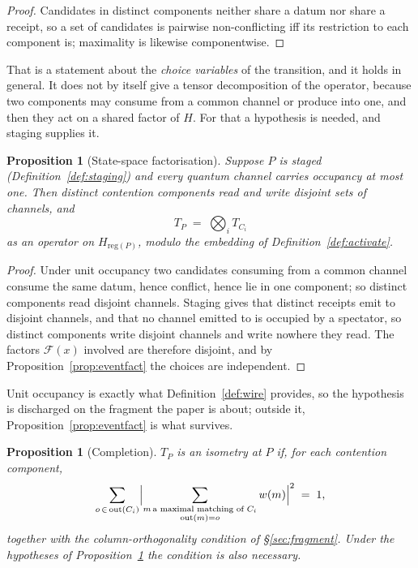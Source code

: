 \documentclass[11pt,a4paper]{article}
\theoremstyle{plain}
\newtheorem{proposition}[theorem]{Proposition}
\theoremstyle{definition}
\theoremstyle{remark}
\newcommand{\Out}{\mathrm{out}}
\begin{document}
\begin{proof}
Candidates in distinct components neither share a datum nor share a receipt, so
a set of candidates is pairwise non-conflicting iff its restriction to each
component is; maximality is likewise componentwise.
\end{proof}

That is a statement about the \emph{choice variables} of the transition, and it
holds in general. It does not by itself give a tensor decomposition of the
operator, because two components may consume from a common channel or produce
into one, and then they act on a shared factor of $H$. For that a hypothesis is
needed, and staging supplies it.

\begin{proposition}[State-space factorisation]\label{prop:statefact}
Suppose $P$ is staged (Definition~\ref{def:staging}) and every quantum channel
carries occupancy at most one. Then distinct contention components read and
write disjoint sets of channels, and
\[
  T_P \;=\; \bigotimes_i T_{C_i}
\]
as an operator on $H_{\mathrm{reg}(P)}$, modulo the embedding of
Definition~\ref{def:activate}.
\end{proposition}

\begin{proof}
Under unit occupancy two candidates consuming from a common channel consume the
same datum, hence conflict, hence lie in one component; so distinct components
read disjoint channels. Staging gives that distinct receipts emit to disjoint
channels, and that no channel emitted to is occupied by a spectator, so distinct
components write disjoint channels and write nowhere they read. The factors
$\mathcal{F}(x)$ involved are therefore disjoint, and by
Proposition~\ref{prop:eventfact} the choices are independent.
\end{proof}

Unit occupancy is exactly what Definition~\ref{def:wire} provides, so the
hypothesis is discharged on the fragment the paper is about; outside it,
Proposition~\ref{prop:eventfact} is what survives.

\begin{proposition}[Completion]\label{prop:complete}
$T_P$ is an isometry at $P$ if, for each contention component,
\[
  \sum_{o \,\in\, \Out(C_i)}
  \Bigl| \sum_{\substack{m \,\text{a maximal matching of } C_i\\ \Out(m) = o}}
          w(m) \Bigr|^{2} \;=\; 1 ,
\]
together with the column-orthogonality condition of \S\ref{sec:fragment}. Under
the hypotheses of Proposition~\ref{prop:statefact} the condition is also
necessary.
\end{proposition}
\end{document}
